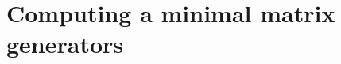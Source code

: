 \documentclass[12pt]{article}
\newcommand{\storeArg}{} %
\renewcommand{\ge}{\geqslant} %
\renewcommand{\le}{\leqslant} %
\newcommand{\NN}{\mathbb{Z}_{\ge 0}} %
\newcommand{\var}{X} %
\newcommand{\field}{\mathbb{K}} %
\newcommand{\polRing}{\field[\var]} %
\newcommand{\Pox}{[\mkern-3mu[ \var ]\mkern-3.2mu]}
\newcommand{\psRing}{\field\Pox}
\newcommand{\matSpace}[1][\rdim]{\renewcommand\storeArg{#1}\matSpaceAux} %
\newcommand{\matSpaceAux}[1][\storeArg]{\field^{\storeArg \times #1}} %
\newcommand{\polMatSpace}[1][\rdim]{\renewcommand\storeArg{#1}\polMatSpaceAux} %
\newcommand{\polMatSpaceAux}[1][\storeArg]{\polRing^{\storeArg \times #1}} %
\newcommand{\psMatSpace}[1][\rdim]{\renewcommand\storeArg{#1}\psMatSpaceAux} %
\newcommand{\psMatSpaceAux}[1][\storeArg]{\psRing^{\storeArg \times #1}} %
\newcommand{\mat}[1]{\mathbf{\MakeUppercase{#1}}} %
\newcommand{\col}[1]{\mathbf{\MakeLowercase{#1}}} %
\newcommand{\rdim}{m} %
\newcommand{\cdim}{n} %
\newcommand{\seqelt}[1]{S_{#1}} %
\newcommand{\seq}{\mathcal{S}} %
\newcommand{\seqpm}{\mat{S}} %
\newcommand{\rel}{\col{p}} %
\newcommand{\relSpace}{\polMatSpace[1][\rdim]} %
\begin{document}
%
%
%

\section{Computing a minimal matrix generators}
\label{sec:computing_matrix_generators}
\end{document}
